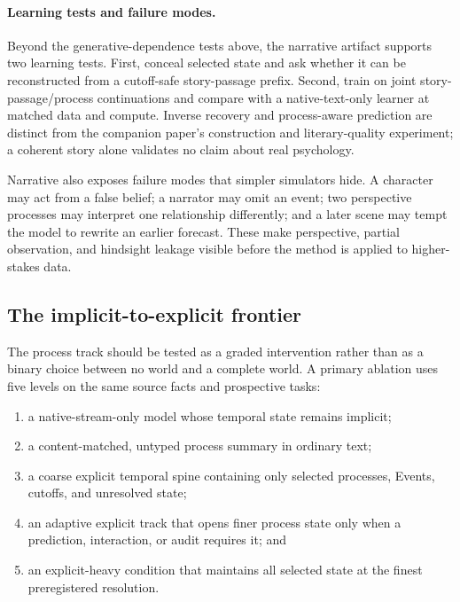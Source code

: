\documentclass[10pt]{article}
\begin{document}
\paragraph{Learning tests and failure modes.}
Beyond the generative-dependence tests above, the narrative artifact supports
two learning tests. First, conceal selected state and ask whether it can be
reconstructed from a cutoff-safe story-passage prefix. Second, train on joint
story-passage/process continuations and compare with a native-text-only learner
at matched data and compute. Inverse recovery and process-aware prediction
are distinct from the companion paper's construction and literary-quality
experiment; a coherent story alone validates no claim about real psychology.

Narrative also exposes failure modes that simpler simulators hide. A character
may act from a false belief; a narrator may omit an event; two perspective processes may
interpret one relationship differently; and a later scene may tempt the model
to rewrite an earlier forecast. These make perspective, partial observation,
and hindsight leakage visible before the method is applied to higher-stakes
data.

\subsection{The implicit-to-explicit frontier}
\label{sec:representation-controls}

The process track should be tested as a graded intervention rather than as a
binary choice between no world and a complete world. A primary ablation uses
five levels on the same source facts and prospective tasks:

\begin{enumerate}
  \item a native-stream-only model whose temporal state remains implicit;
  \item a content-matched, untyped process summary in ordinary text;
  \item a coarse explicit temporal spine containing only selected processes,
    Events, cutoffs, and unresolved state;
  \item an adaptive explicit track that opens finer process state only when a
    prediction, interaction, or audit requires it; and
  \item an explicit-heavy condition that maintains all selected state at the
    finest preregistered resolution.
\end{enumerate}
\end{document}
